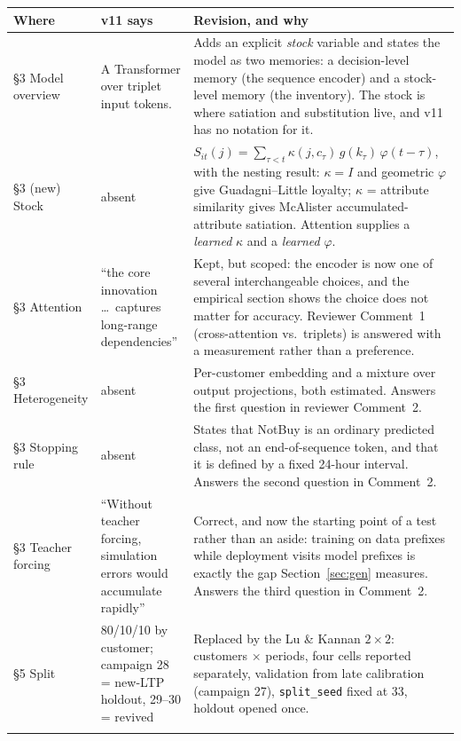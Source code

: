 \documentclass[11pt]{article}
\newcommand{\new}[1]{\textcolor{blue!60!black}{#1}}
\begin{document}
\begin{longtable}{p{3.4cm}p{5.2cm}p{5.6cm}}
\toprule
Where & v11 says & Revision, and why \\
\midrule
\endhead
\S3 Model overview & A Transformer over triplet input tokens. & \new{Adds an
explicit \emph{stock} variable and states the model as two memories: a
decision-level memory (the sequence encoder) and a stock-level memory (the
inventory). The stock is where satiation and substitution live, and v11 has no
notation for it.} \\
\addlinespace
\S3 (new) Stock & absent & \new{$S_{it}(j)=\sum_{\tau<t}\kappa(j,c_\tau)\,
g(k_\tau)\,\varphi(t-\tau)$, with the nesting result: $\kappa=I$ and geometric
$\varphi$ give Guadagni--Little loyalty; $\kappa$ = attribute similarity gives
McAlister accumulated-attribute satiation. Attention supplies a \emph{learned}
$\kappa$ and a \emph{learned} $\varphi$.} \\
\addlinespace
\S3 Attention & ``the core innovation \dots\ captures long-range dependencies'' &
\new{Kept, but scoped: the encoder is now one of several interchangeable
choices, and the empirical section shows the choice does not matter for
accuracy. Reviewer Comment~1 (cross-attention vs.\ triplets) is answered with a
measurement rather than a preference.} \\
\addlinespace
\S3 Heterogeneity & absent & \new{Per-customer embedding and a mixture over
output projections, both estimated. Answers the first question in reviewer
Comment~2.} \\
\addlinespace
\S3 Stopping rule & absent & \new{States that NotBuy is an ordinary predicted
class, not an end-of-sequence token, and that it is defined by a fixed 24-hour
interval. Answers the second question in Comment~2.} \\
\addlinespace
\S3 Teacher forcing & ``Without teacher forcing, simulation errors would
accumulate rapidly'' & \new{Correct, and now the starting point of a test rather
than an aside: training on data prefixes while deployment visits model prefixes
is exactly the gap Section~\ref{sec:gen} measures. Answers the third question in
Comment~2.} \\
\addlinespace
\S5 Split & 80/10/10 by customer; campaign 28 = new-LTP holdout, 29--30 =
revived & \new{Replaced by the Lu \& Kannan $2\times2$: customers $\times$
periods, four cells reported separately, validation from late calibration
(campaign 27), \texttt{split\_seed} fixed at 33, holdout opened once.} \\
\addlinespace

\end{longtable}
\end{document}
